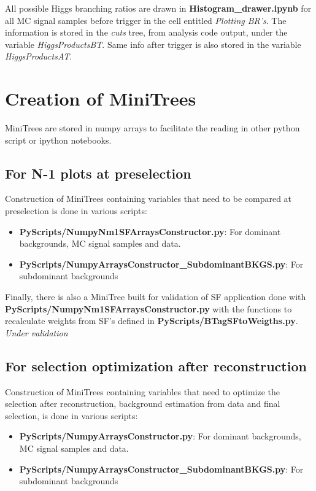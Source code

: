 \documentclass[11pt,a4paper]{article}
\begin{document}
All possible Higgs branching ratios are drawn in \textbf{Histogram\_drawer.ipynb} for all MC signal samples before trigger in the cell entitled \textit{Plotting BR's}. The information is stored in the \textit{cuts} tree, from analysis code output, under the variable \textit{HiggsProductsBT}. Same info after trigger is also stored in the variable \textit{HiggsProductsAT}.

\section{Creation of MiniTrees}

MiniTrees are stored in numpy arrays to facilitate the reading in other python script or ipython notebooks.

\subsection{For N-1 plots at preselection}
\label{nm1minitrees}

Construction of MiniTrees containing variables that need to be compared at preselection is done in various scripts:
\begin{itemize}
\item \textbf{PyScripts/NumpyNm1SFArraysConstructor.py}: For dominant backgrounds, MC signal samples and data.
\item \textbf{PyScripts/NumpyArraysConstructor\_SubdominantBKGS.py}: For subdominant backgrounds
\end{itemize}
Finally, there is also a MiniTree built for validation of SF application done with \textbf{PyScripts/NumpyNm1SFArraysConstructor.py} with the functions to recalculate weights from SF's defined in \textbf{PyScripts/BTagSFtoWeigths.py}. \textit{Under validation}

\subsection{For selection optimization after reconstruction}
\label{selminitrees}

Construction of MiniTrees containing variables that need to optimize the selection after reconstruction, background estimation from data and final selection, is done in various scripts:
\begin{itemize}
\item \textbf{PyScripts/NumpyArraysConstructor.py}: For dominant backgrounds, MC signal samples and data.
\item \textbf{PyScripts/NumpyArraysConstructor\_SubdominantBKGS.py}: For subdominant backgrounds
\end{itemize}
\end{document}
